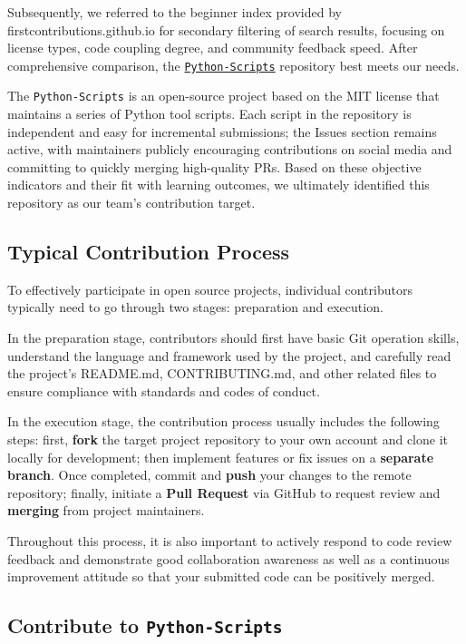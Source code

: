 \documentclass[12pt]{article}
\begin{document}
Subsequently, we referred to the beginner index provided by firstcontributions.github.io for secondary filtering of search results, focusing on license types, code coupling degree, and community feedback speed. After comprehensive comparison, the \href{https://github.com/DhanushNehru/Python-Scripts}{\texttt{Python-Scripts}} repository best meets our needs. 

The \texttt{Python-Scripts} is an open-source project based on the MIT license that maintains a series of Python tool scripts. Each script in the repository is independent and easy for incremental submissions; the Issues section remains active, with maintainers publicly encouraging contributions on social media and committing to quickly merging high-quality PRs. Based on these objective indicators and their fit with learning outcomes, we ultimately identified this repository as our team's contribution target.


\subsection{Typical Contribution Process}
To effectively participate in open source projects, individual contributors typically need to go through two stages: preparation and execution. 

In the preparation stage, contributors should first have basic Git operation skills, understand the language and framework used by the project, and carefully read the project's README.md, CONTRIBUTING.md, and other related files to ensure compliance with standards and codes of conduct. 

In the execution stage, the contribution process usually includes the following steps: first, \textbf{fork} the target project repository to your own account and clone it locally for development; then implement features or fix issues on a \textbf{separate branch}. Once completed, commit and \textbf{push} your changes to the remote repository; finally, initiate a \textbf{Pull Request} via GitHub to request review and \textbf{merging} from project maintainers. 

Throughout this process, it is also important to actively respond to code review feedback and demonstrate good collaboration awareness as well as a continuous improvement attitude so that your submitted code can be positively merged.

\subsection{Contribute to \texttt{Python-Scripts}}
\end{document}
